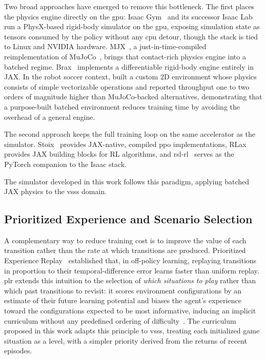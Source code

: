Two broad approaches have emerged to remove this bottleneck.  The first places
the physics engine directly on the \gls{gpu}: Isaac Gym~\cite{makoviychuk2021isaacgym}
and its successor Isaac Lab run a PhysX-based rigid-body simulator on the \gls{gpu},
exposing simulation state as tensors consumed by the policy without any \gls{cpu}
detour, though the stack is tied to Linux and NVIDIA hardware.
MJX~\cite{zakka2025mujocoplayground}, a just-in-time-compiled reimplementation
of MuJoCo~\cite{todorov2012mujoco}, brings that contact-rich physics engine into a batched regime.
Brax~\cite{freeman2021brax} implements a differentiable rigid-body engine
entirely in JAX.  In the robot soccer context,
\textcite{scaling_marl_2d} built a custom 2D environment whose physics consists
of simple vectorizable operations and reported throughput one to two orders of
magnitude higher than MuJoCo-backed alternatives, demonstrating that a
purpose-built batched environment reduces training time by avoiding the overhead
of a general engine.

The second approach keeps the full training loop on the same accelerator as the
simulator.  Stoix~\cite{toledo2024stoix} provides JAX-native, compiled
\gls{ppo} implementations, RLax~\cite{deepmind2020rlax} provides JAX building blocks for RL algorithms, and rsl-rl~\cite{rslrl} serves as the PyTorch companion
to the Isaac stack.

The simulator developed in this work follows this paradigm, applying batched
JAX physics to the \gls{vsss} domain.

\subsection{Prioritized Experience and Scenario Selection}

A complementary way to reduce training cost is to improve the value of each
transition rather than the rate at which transitions are produced.  Prioritized
Experience Replay~\cite{schaul2016per} established that, in off-policy learning,
replaying transitions in proportion to their temporal-difference error learns
faster than uniform replay. \gls{plr} extends this
intuition to the selection of \emph{which situations to play} rather than which
past transitions to revisit: it scores environment configurations by an estimate
of their future learning potential and biases the agent's experience toward the
configurations expected to be most informative, inducing an implicit curriculum
without any predefined ordering of difficulty~\cite{prioritized_level_replay}.  The curriculum
proposed in this work adapts this principle to \gls{vsss}, treating each
initialized game situation as a level, with a simpler priority derived from the returns of recent episodes.

